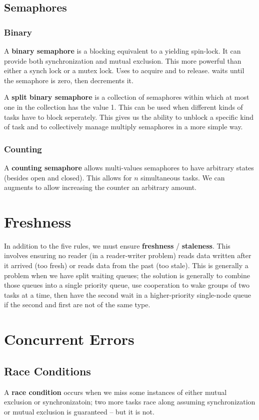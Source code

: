 \documentclass[12pt]{article}
\begin{document}
\subsection{Semaphores}
\subsubsection{Binary}
A {\bf binary semaphore} is a blocking equivalent to a yielding spin-lock. It can provide both synchronization and mutual exclusion. This more powerful than either a synch lock or a mutex lock. Uses  to acquire and  to release.  waits until the semaphore is zero, then decrements it.

A {\bf split binary semaphore} is a collection of semaphores within which at most one in the collection has the value 1. This can be used when different kinds of tasks have to block seperately. This gives us the ability to unblock a specific kind of task and to collectively manage multiply semaphores in a more simple way.

\subsubsection{Counting}
A {\bf counting semaphore} allows multi-values semaphores to have arbitrary states (besides open and closed). This allows for $n$ simultaneous tasks. We can augments  to allow increasing the counter an arbitrary amount.

\section{Freshness}
In addition to the five rules, we must ensure {\bf freshness} / {\bf staleness}. This involves ensuring no reader (in a reader-writer problem) reads data written after it arrived (too fresh) or reads data from the past (too stale). This is generally a problem when we have split waiting queues; the solution is generally to combine those queues into a single priority queue, use cooperation to wake groups of two tasks at a time, then have the second wait in a higher-priority single-node queue if the second and first are not of the same type.

\section{Concurrent Errors}
\subsection{Race Conditions}
A {\bf race condition} occurs when we miss some instances of either mutual exclusion or synchronizatoin; two more tasks race along assuming synchronization or mutual exclusion is guaranteed -- but it is not.
\end{document}
